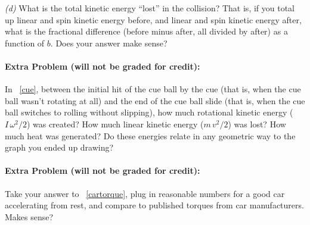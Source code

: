 \documentclass[12pt]{article}
\begin{document}
\textsl{(d)} What is the total kinetic energy ``lost'' in the
collision? That is, if you total up linear and spin kinetic energy
before, and linear and spin kinetic energy after, what is the
fractional difference (before minus after, all divided by after) as a
function of $b$.  Does your answer make sense?

\paragraph{Extra Problem (will not be graded for credit):}%
In \problemname~\ref{cue}, between the initial hit of the cue ball by the cue (that is, when the
cue ball wasn't rotating at all) and the end of the cue ball
slide (that is, when the cue ball switches to rolling without
slipping), how much rotational kinetic energy ($I\,\omega^2 / 2$) was
created? How much linear kinetic energy ($m\,v^2 / 2$) was lost? How
much heat was generated? Do these energies relate in any geometric way
to the graph you ended up drawing?

\paragraph{Extra Problem (will not be graded for credit):}%
Take your answer to \problemname~\ref{cartorque}, plug in reasonable
numbers for a good car accelerating from rest, and compare to
published torques from car manufacturers. Makes sense?
\end{document}
